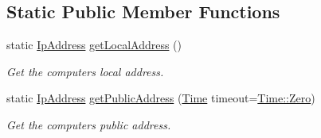 \subsection*{Static Public Member Functions}
\begin{DoxyCompactItemize}
\item 
static \hyperlink{classsf_1_1_ip_address}{Ip\+Address} \hyperlink{classsf_1_1_ip_address_a4c31622ad87edca48adbb8e8ed00ee4a}{get\+Local\+Address} ()
\begin{DoxyCompactList}\small\item\em Get the computer\textquotesingle{}s local address. \end{DoxyCompactList}\item 
static \hyperlink{classsf_1_1_ip_address}{Ip\+Address} \hyperlink{classsf_1_1_ip_address_a5c5cbf67e4aacf23c24f2ad991df4c55}{get\+Public\+Address} (\hyperlink{classsf_1_1_time}{Time} timeout=\hyperlink{classsf_1_1_time_a8db127b632fa8da21550e7282af11fa0}{Time\+::\+Zero})
\begin{DoxyCompactList}\small\item\em Get the computer\textquotesingle{}s public address. \end{DoxyCompactList}\end{DoxyCompactItemize}
